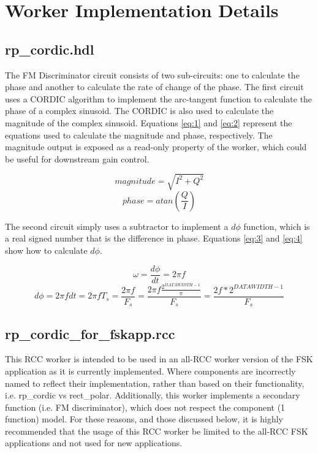 \documentclass{article}
\def\comp{rp\_cordic}
\def\rcc_comp{rp\_cordic\_for\_fskapp}
\begin{document}
\section*{Worker Implementation Details}
\subsection*{\comp.hdl}
The FM Discriminator circuit consists of two sub-circuits: one to calculate the phase and another to calculate the rate of change of the phase. The first circuit uses a CORDIC algorithm to implement the arc-tangent function to calculate the phase of a complex sinusoid. The CORDIC is also used to calculate the magnitude of the complex sinusoid. Equations \ref{eq:1} and \ref{eq:2} represent the equations used to calculate the magnitude and phase, respectively. The magnitude output is exposed as a read-only property of the worker, which could be useful for downstream gain control.

\begin{equation} \label{eq:1}
	magnitude = \sqrt{I^2 + Q^2}
\end{equation}
\begin{equation} \label{eq:2}
	phase = atan(\frac{Q}{I})
\end{equation}

The second circuit simply uses a subtractor to implement a $d\phi$ function, which is a real signed number that is the difference in phase. Equations \ref{eq:3} and \ref{eq:4} show how to calculate $d\phi$.

\begin{equation} \label{eq:3}
	\omega = \frac{d\phi}{dt} = {2 \pi f}
\end{equation}
\begin{equation} \label{eq:4}
	d\phi = {2 \pi f dt} = {2 \pi f T_s} = \frac{2 \pi f}{F_s} = \frac{2 \pi f \frac{2^{DATAWIDTH-1}}{\pi}}{F_s} = \frac{2f*2^{DATAWIDTH-1}}{F_s}
\end{equation}
\newpage
\subsection*{\rcc_comp.rcc}
This RCC worker is intended to be used in an all-RCC worker version of the FSK application
as it is currently implemented. Where components are incorrectly named to reflect their implementation, rather than based on their functionality, i.e. rp\_cordic vs rect\_polar.
Additionally, this worker implements a secondary function (i.e. FM discriminator), which does not respect the component (1 function) model.
For these reasons, and those discussed below, it is highly recommended that the usage of this RCC worker be limited to the all-RCC FSK applications and not used for new applications.
\end{document}
